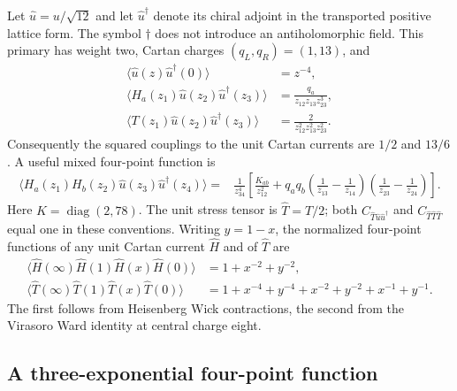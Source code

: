 \documentclass[11pt,a4paper]{article}
\theoremstyle{definition}
\begin{document}
Let $\widehat u=u/\sqrt{12}$ and let $\widehat u^\dagger$ denote its
chiral adjoint in the transported positive lattice form.  The symbol
$\dagger$ does not introduce an antiholomorphic field.  This primary has
weight two, Cartan charges $(q_L,q_R)=(1,13)$, and
\begin{align}
 \langle\widehat u(z)\widehat u^\dagger(0)\rangle&=z^{-4},\\
 \langle H_a(z_1)\widehat u(z_2)\widehat u^\dagger(z_3)\rangle
  &=\frac{q_a}{z_{12}z_{13}z_{23}^{3}},\\
 \langle T(z_1)\widehat u(z_2)\widehat u^\dagger(z_3)\rangle
  &=\frac{2}{z_{12}^{2}z_{13}^{2}z_{23}^{2}}.
\end{align}
Consequently the squared couplings to the unit Cartan currents are
$1/2$ and $13/6$.  A useful mixed four-point function is
\begin{equation}
 \begin{aligned}
 \langle H_a(z_1)H_b(z_2)\widehat u(z_3)
                  \widehat u^\dagger(z_4)\rangle
 ={}&\frac{1}{z_{34}^{4}}\left[
 \frac{K_{ab}}{z_{12}^{2}}+
 q_aq_b\left(\frac1{z_{13}}-\frac1{z_{14}}\right)
       \left(\frac1{z_{23}}-\frac1{z_{24}}\right)\right].
 \end{aligned}
\end{equation}
Here $K=\operatorname{diag}(2,78)$.
The unit stress tensor is $\widehat T=T/2$; both
$C_{\widehat T\widehat u\widehat u^\dagger}$ and
$C_{\widehat T\widehat T\widehat T}$ equal one in these conventions.
Writing $y=1-x$, the normalized four-point functions of any unit
Cartan current $\widehat H$ and of $\widehat T$ are
\begin{align}
 \langle\widehat H(\infty)\widehat H(1)
                 \widehat H(x)\widehat H(0)\rangle
 &=1+x^{-2}+y^{-2},\\
 \langle\widehat T(\infty)\widehat T(1)
                 \widehat T(x)\widehat T(0)\rangle
 &=1+x^{-4}+y^{-4}+x^{-2}+y^{-2}+x^{-1}+y^{-1}.
\end{align}
The first follows from Heisenberg Wick contractions, the second from
the Virasoro Ward identity at central charge eight.

\subsection{A three-exponential four-point function}
\end{document}
